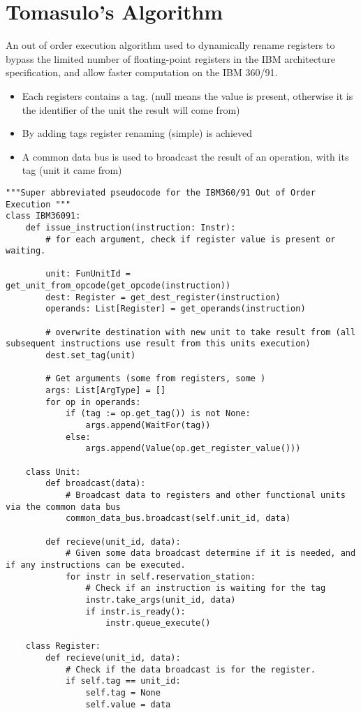 \section{Tomasulo's Algorithm}
An out of order execution algorithm used to dynamically rename registers to bypass the limited number of floating-point registers in the IBM architecture specification, and allow faster computation on the IBM 360/91.
\begin{itemize}
	\item Each registers contains a tag. (null means the value is present, otherwise it is the identifier of the unit the result will come from)
	\item By adding tags register renaming (simple) is achieved
	\item A common data bus is used to broadcast the result of an operation, with its tag (unit it came from)
\end{itemize}
\begin{verbatim}
"""Super abbreviated pseudocode for the IBM360/91 Out of Order Execution """
class IBM36091:
    def issue_instruction(instruction: Instr):
        # for each argument, check if register value is present or waiting.

        unit: FunUnitId = get_unit_from_opcode(get_opcode(instruction))
        dest: Register = get_dest_register(instruction)
        operands: List[Register] = get_operands(instruction)

        # overwrite destination with new unit to take result from (all subsequent instructions use result from this units execution)
        dest.set_tag(unit)
        
        # Get arguments (some from registers, some )
        args: List[ArgType] = []
        for op in operands:
            if (tag := op.get_tag()) is not None:
                args.append(WaitFor(tag))
            else:
                args.append(Value(op.get_register_value()))
    
    class Unit:
        def broadcast(data):
            # Broadcast data to registers and other functional units via the common data bus
            common_data_bus.broadcast(self.unit_id, data)
        
        def recieve(unit_id, data):
            # Given some data broadcast determine if it is needed, and if any instructions can be executed.
            for instr in self.reservation_station:
                # Check if an instruction is waiting for the tag
                instr.take_args(unit_id, data)
                if instr.is_ready():
                    instr.queue_execute()
    
    class Register:
        def recieve(unit_id, data):
            # Check if the data broadcast is for the register.
            if self.tag == unit_id:
                self.tag = None
                self.value = data
\end{verbatim}
